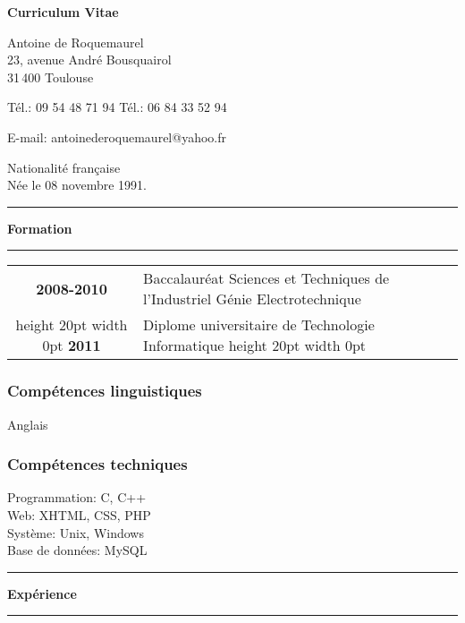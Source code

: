 \documentclass[a4paper,11pt]{article} %
\newcommand\espace{\vrule height 20pt width 0pt}
\newcommand{\titre}[1]{%
	\begin{center}
	\bigskip
	\rule{\textwidth}{1pt}
	\par\vspace{0.1cm}
        \textbf{\LARGE #1}
	\par\rule{\textwidth}{1pt}
	\end{center}
	\bigskip
	}
\begin{document}

\begin{center}
\par\textbf{\huge Curriculum Vitae}
\end{center}

\vspace{1.5cm}

\begin{flushleft}
Antoine de Roquemaurel\\
23, avenue André Bousquairol\\
31\,400 Toulouse\\

\medskip
\begin{flushright}
Tél.: 09 54 48 71 94
Tél.: 06 84 33 52 94

E-mail: antoinederoquemaurel@yahoo.fr


\end{flushright}

\begin{flushleft}
Nationalité française \\
Née le 08 novembre 1991.
\end{flushleft}

\end{flushleft}

\titre{Formation}

\begin{tabular}{c@{ :  }p{}}


\textbf{2008-2010} & Baccalauréat Sciences et Techniques de l'Industriel Génie Electrotechnique \\

\espace
\textbf{2011} & Diplome universitaire de Technologie Informatique 
\espace
\end{tabular}
\subsubsection*{Compétences linguistiques}
	Anglais \\
\subsubsection*{Compétences techniques}
	Programmation: C, C++\\
	Web: XHTML, CSS, PHP\\
	Système: Unix, Windows\\
	Base de données: MySQL
\titre{Expérience}
\end{document}
